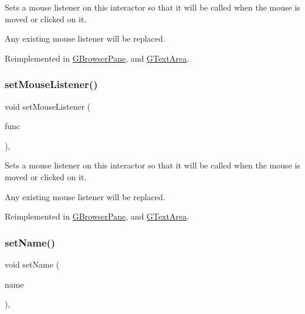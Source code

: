 Sets a mouse listener on this interactor so that it will be called when the mouse is moved or clicked on it. 

Any existing mouse listener will be replaced. 

Reimplemented in \mbox{\hyperlink{classGBrowserPane_a2c6a3746da7ffa3819294896d4423059}{G\+Browser\+Pane}}, and \mbox{\hyperlink{classGTextArea_a2c6a3746da7ffa3819294896d4423059}{G\+Text\+Area}}.

\mbox{\label{classGInteractor_aea7f647ea62d59f71b5fad6aa65eeaf9}} 
\subsubsection{\texorpdfstring{set\+Mouse\+Listener()}{setMouseListener()}\hspace{0.1cm}{\footnotesize\ttfamily [2/2]}}
{\footnotesize\ttfamily void set\+Mouse\+Listener (\begin{DoxyParamCaption}\item[{G\+Event\+Listener\+Void}]{func }\end{DoxyParamCaption})\hspace{0.3cm}{\ttfamily [virtual]}, {\ttfamily [inherited]}}



Sets a mouse listener on this interactor so that it will be called when the mouse is moved or clicked on it. 

Any existing mouse listener will be replaced. 

Reimplemented in \mbox{\hyperlink{classGBrowserPane_a3ed42c5f929cba378927916dd73e6576}{G\+Browser\+Pane}}, and \mbox{\hyperlink{classGTextArea_a3ed42c5f929cba378927916dd73e6576}{G\+Text\+Area}}.

\mbox{\label{classGInteractor_a9d3a2685df23b5e7cbf59c19c4a1f9b5}} 
\subsubsection{\texorpdfstring{set\+Name()}{setName()}}
{\footnotesize\ttfamily void set\+Name (\begin{DoxyParamCaption}\item[{const std\+::string \&}]{name }\end{DoxyParamCaption})\hspace{0.3cm}{\ttfamily [virtual]}, {\ttfamily [inherited]}}



